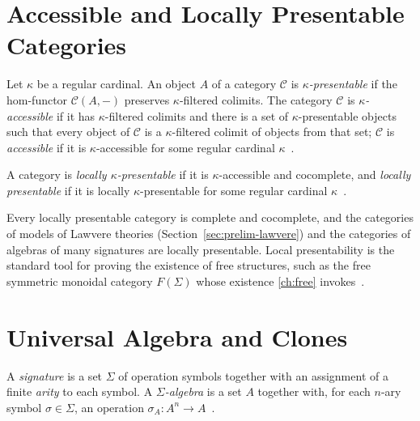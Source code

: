 \section{Accessible and Locally Presentable Categories}\label{sec:prelim-acc}

\begin{definition}
Let $\kappa$ be a regular cardinal. An object $A$ of a category
$\mathcal{C}$ is \emph{$\kappa$-presentable} if the hom-functor
$\mathcal{C} (A, -)$ preserves $\kappa$-filtered colimits. The category
$\mathcal{C}$ is \emph{$\kappa$-accessible} if it has $\kappa$-filtered
colimits and there is a set of $\kappa$-presentable objects such that every
object of $\mathcal{C}$ is a $\kappa$-filtered colimit of objects from that
set; $\mathcal{C}$ is \emph{accessible} if it is $\kappa$-accessible for some
regular cardinal $\kappa$~\cite{adamek}.
\end{definition}

\begin{definition}
A category is \emph{locally $\kappa$-presentable} if it is
$\kappa$-accessible and cocomplete, and \emph{locally presentable} if it is
locally $\kappa$-presentable for some regular cardinal $\kappa$~\cite{adamek}.
\end{definition}

\begin{remark}
Every locally presentable category is complete and cocomplete, and the
categories of models of Lawvere theories (Section~\ref{sec:prelim-lawvere})
and the categories of algebras of many signatures are locally presentable.
Local presentability is the standard tool for proving the existence of free
structures, such as the free symmetric monoidal category $F (\Sigma)$ whose
existence \autoref{ch:free} invokes~\cite{adamek, lawvere}.
\end{remark}

\section{Universal Algebra and Clones}\label{sec:prelim-univ}

\begin{definition}
A \emph{signature} is a set $\Sigma$ of operation symbols together with an
assignment of a finite \emph{arity} to each symbol. A \emph{$\Sigma$-algebra}
is a set $A$ together with, for each $n$-ary symbol $\sigma \in \Sigma$, an
operation $\sigma_A \colon A^n \to A$~\cite{knuthbendix}.
\end{definition}

